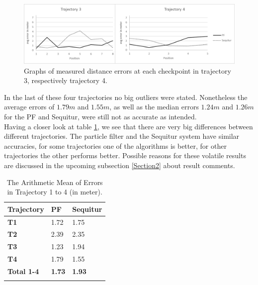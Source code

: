 \begin{figure}[th]
\centering
\includegraphics[width=1.0\textwidth]{Figures/trajectory3_4_results}
\decoRule
\caption[Localization Results of Trajectory 3 and 4]{Graphs of measured distance errors at each checkpoint in trajectory 3, respectively trajectory 4.}
\label{fig:trajectory3and4_results}
\end{figure}In the last of these four trajectories no big outliers were stated. Nonetheless the average errors of $1.79m$ and $1.55m$, as well as the median errors $1.24m$ and $1.26m$ for the PF and Sequitur, were still not as accurate as intended.\\
\noindent\hspace*{5mm}%
Having a closer look at table \ref{tab:arithmetic_errors}, we see that there are very big differences between different trajectories. The particle filter and the Sequitur system have similar accuracies, for some trajectories one of the algorithms is better, for other trajectories the other performs better. Possible reasons for these volatile results are discussed in the upcoming subsection  \ref{Section2} about result comments. 

\begin{table}
\caption{The Arithmetic Mean of Errors in Trajectory 1 to 4 (in meter).}
\label{tab:arithmetic_errors}
\centering
\begin{tabular}{l l l}
\toprule
\textbf{Trajectory} & \textbf{PF} & \textbf{Sequitur}\\
\midrule
\textbf{T1} & 1.72 & 1.75\\
\textbf{T2} & 2.39 & 2.35\\
\textbf{T3} & 1.23 & 1.94\\
\textbf{T4} & 1.79 & 1.55\\
\midrule
\textbf{Total 1-4}  & \textbf{1.73} & \textbf{1.93}\\
\bottomrule\\
\end{tabular}
\end{table}


